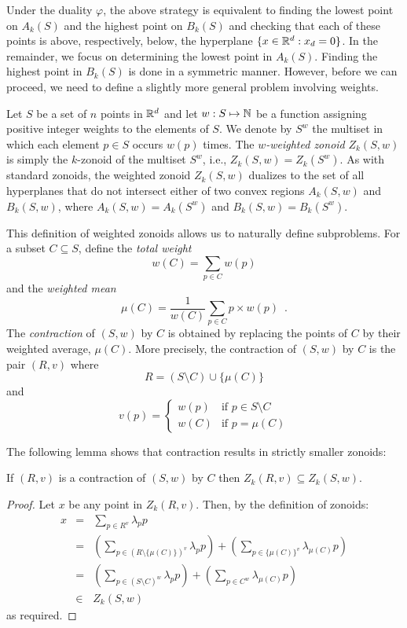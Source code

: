 \documentclass[lotsofwhite]{patmorin}
\newcommand{\dual}{\varphi}
\begin{document}
Under the duality $\dual$, the above strategy is equivalent to finding
the lowest point on $A_k(S)$ and the highest point on $B_k(S)$ and
checking that each of these points is above, respectively, below, the
hyperplane $\{x\in\mathbb{R}^d:x_d=0\}$.  In the remainder, we focus on
determining the lowest point in $A_k(S)$.  Finding the highest point
in $B_k(S)$ is done in a symmetric manner.  However, before we can
proceed, we need to define a slightly more general problem involving
weights.

Let $S$ be a set of $n$ points in $\mathbb{R}^d$ and let $w:S\mapsto\mathbb{N}$ be a
function assigning positive integer weights to the elements of $S$.
We denote by $S^w$ the multiset in which each element $p\in S$ occurs
$w(p)$ times.  The \emph{$w$-weighted zonoid} $Z_k(S,w)$ is simply the
$k$-zonoid of the multiset $S^w$, i.e., $Z_k(S,w)=Z_k(S^w)$.  As with
standard zonoids, the weighted zonoid $Z_k(S,w)$ dualizes to the set
of all hyperplanes that do not intersect either of two convex regions
$A_k(S,w)$ and $B_k(S,w)$, where $A_k(S,w)=A_k(S^w)$ and
$B_k(S,w)=B_k(S^w)$.

This definition of weighted zonoids allows us to naturally define
subproblems.  For a subset $C\subseteq S$, define the \emph{total
weight}
\[
       w(C)=\sum_{p\in C}w(p)
\]
and the \emph{weighted mean}
\[ 
       \mu(C)=\frac{1}{w(C)}\sum_{p\in C} p\times w(p) \enspace .
\]
The \emph{contraction} of
$(S,w)$ by $C$ is obtained by replacing the points of $C$ by their
weighted average, $\mu(C)$.  More precisely, the contraction of
$(S,w)$ by $C$ is the pair $(R,v)$ where 
\[ R = (S\setminus C) \cup \{ \mu(C) \} \] 
and 
\[ v(p) = \left\{\begin{array}{ll} 
        w(p) & \mbox{if $p\in S\setminus C$} \\ 
        w(C) & \mbox{if $p=\mu(C)$} \end{array}\right.
\]

The following lemma shows that contraction results in strictly smaller
zonoids:

\begin{lem}
If $(R,v)$ is a contraction of $(S,w)$ by $C$ then $Z_k(R,v)
\subseteq Z_k(S,w)$.
\end{lem}

\begin{proof}
Let $x$ be any point in $Z_k(R,v)$.  Then, by the definition of
zonoids:
\begin{eqnarray*}
    x &=& \sum_{p\in R^v} \lambda_pp \\
      &=& \left( \sum_{p\in (R\setminus \{\mu(C)\})^v} \lambda_pp \right)
          + \left( \sum_{p\in \{\mu(C)\}^v}\lambda_{\mu(C)}p \right) \\
      &=& \left(\sum_{p\in (S\setminus C)^w} \lambda_pp \right)
          + \left(\sum_{p\in C^w}\lambda_{\mu(C)} p\right) \\
      &\in& Z_k(S,w)
\end{eqnarray*}
as required.
\end{proof}
\end{document}
